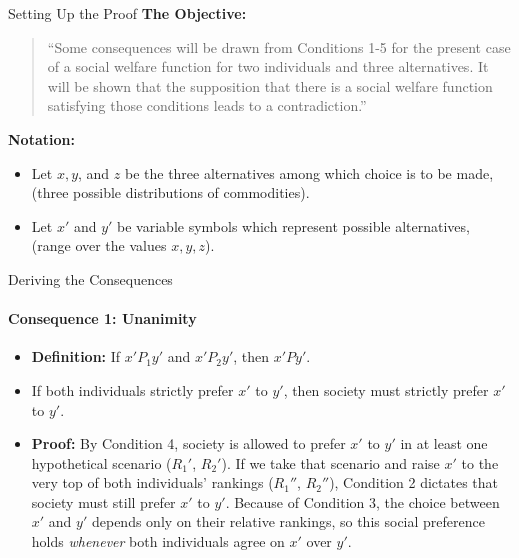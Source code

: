 \documentclass{beamer}
\begin{document}
\begin{frame}{Setting Up the Proof}
    \textbf{The Objective:}
    \vspace{0.25 cm}
    \begin{quote}
        ``Some consequences will be drawn from Conditions 1-5 for the present case of a social welfare function for two individuals and three alternatives. It will be shown that the supposition that there is a social welfare function satisfying those conditions leads to a contradiction.''
    \end{quote}
    \vspace{0.5 cm}
    \textbf{Notation:}
    \begin{itemize}
        \item Let $x, y$, and $z$ be the three alternatives among which choice is to be made, (three possible distributions of commodities).
        \item Let $x'$ and $y'$ be variable symbols which represent possible alternatives, (range over the values $x, y, z$).
    \end{itemize}
\end{frame}

\begin{frame}{Deriving the Consequences}
    \framesubtitle{Consequence 1: Unanimity}
    \begin{itemize}
        \item \textbf{Definition:} If $x'P_1y'$ and $x'P_2y'$, then $x'Py'$.
        \item[$\Rightarrow$] If both individuals strictly prefer $x'$ to $y'$, then society must strictly prefer $x'$ to $y'$.
        \vspace{0.25 cm}
        \item \textbf{Proof:} By Condition 4, society is allowed to prefer $x'$ to $y'$ in at least one hypothetical scenario ($R_1'$, $R_2'$). If we take that scenario and raise $x'$ to the very top of both individuals' rankings ($R_1''$, $R_2''$), Condition 2 dictates that society must still prefer $x'$ to $y'$. Because of Condition 3, the choice between $x'$ and $y'$ depends only on their relative rankings, so this social preference holds \textit{whenever} both individuals agree on $x'$ over $y'$.

    \end{itemize}
\end{frame}
\end{document}
